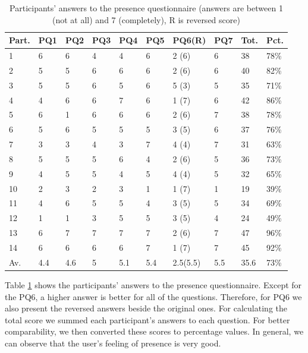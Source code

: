 \documentclass[10pt, conference]{IEEEtran}
\begin{document}
\begin{table}[h!]
\centering
\begin{tabular}{m{1em} m{1em} m{1em} m{1em} m{1em} m{1em} m{3em} m{1em} m{1em} m{3em}}
\hline
Part. & PQ1 & PQ2 & PQ3 & PQ4 & PQ5 & PQ6(R) & PQ7 & Tot. & Pct.\\ 
 \hline
 1 & 6 & 6 & 4 & 4 & 6 & 2 (6) & 6 & 38 & 78\%\\
2 & 5 & 5 & 6 & 6 & 6 & 2 (6) & 6 & 40 & 82\%\\
3 & 5 & 5 & 6 & 5 & 6 & 5 (3) & 5 & 35 & 71\%\\
4 & 4 & 6 & 6 & 7 & 6 & 1 (7) & 6 & 42 & 86\%\\
5 & 6 & 1 & 6 & 6 & 6 & 2 (6) & 7 & 38 & 78\%\\
6 & 5 & 6 & 5 & 5 & 5 & 3 (5) & 6 & 37& 76\%\\
7 & 3 & 3 & 4 & 3 & 7 & 4 (4) & 7 & 31& 63\%\\
8 & 5 & 5 & 5 & 6 & 4 & 2 (6) & 5 & 36& 73\%\\
9 & 4 & 5 & 5 & 4 & 5 & 4 (4) & 5 & 32& 65\%\\
10 & 2 & 3 & 2 & 3 & 1 & 1 (7) & 1 & 19& 39\%\\
11 & 4 & 6 & 5 & 5 & 4 & 3 (5) & 5 & 34& 69\%\\
12 & 1 & 1 & 3 & 5 & 5 & 3 (5) & 4 & 24& 49\%\\
13 & 6 & 7 & 7 & 7 & 7 & 2 (6) & 7 & 47& 96\%\\
14 & 6 & 6 & 6 & 6 & 7 & 1 (7) & 7 & 45& 92\%\\
 \hline
Av. & 4.4 & 4.6 & 5 & 5.1	& 5.4 & 2.5(5.5)	& 5.5 & 35.6 & 73\% \\
 \hline
\end{tabular}
\caption{Participants' answers to the presence questionnaire (answers are between 1 (not at all) and 7 (completely), R is reversed score)}
\label{presence_answers_table}
\end{table}

Table \ref{presence_answers_table} shows the participants' answers to the presence questionnaire. Except for the PQ6, a higher answer is better for all of the questions. Therefore, for PQ6 we also present the reversed answers beside the original ones. For calculating the total score we summed each participant's answers to each question. For better comparability, we then converted these scores to percentage values. In general, we can observe that the user's feeling of presence is very good. 
\end{document}
